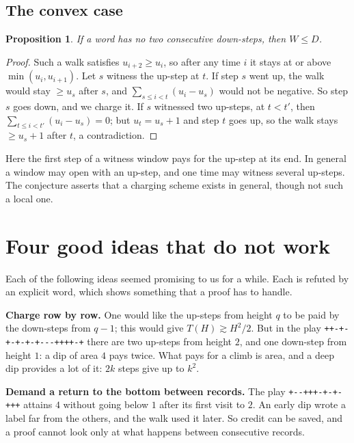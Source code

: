 \documentclass[11pt]{amsart}
\newtheorem{proposition}[theorem]{Proposition}
\theoremstyle{definition}
\begin{document}
\subsection{The convex case}
\begin{proposition}\label{prop:convex}
If a word has no two consecutive down-steps, then $W\le D$.
\end{proposition}

\begin{proof}
Such a walk satisfies $u_{i+2}\ge u_i$, so after any time $i$ it stays at or above $\min(u_i,u_{i+1})$. Let $s$ witness the
up-step at $t$. If step $s$ went up, the walk would stay $\ge u_s$ after $s$, and $\sum_{s\le i<t}(u_i-u_s)$ would not be
negative. So step $s$ goes down, and we charge it. If $s$ witnessed two up-steps, at $t<t'$, then $\sum_{t\le i<t'}(u_i-u_s)=0$;
but $u_t=u_s+1$ and step $t$ goes up, so the walk stays $\ge u_s+1$ after $t$, a contradiction.
\end{proof}

Here the first step of a witness window pays for the up-step at its end. In general a window may open with an
up-step, and one time may witness several up-steps. The conjecture asserts that a charging scheme exists in general, though not such a local one.

\section{Four good ideas that do not work}\label{sec:obstructions}

Each of the following ideas seemed promising to us for a while. Each is refuted by an explicit word, which shows
something that a proof has to handle.

\medskip\noindent\textbf{Charge row by row.} One would like the up-steps from height $q$ to be paid by the down-steps
from $q-1$; this would give $T(H)\gtrsim H^2/2$. But in the play \texttt{++-+-+-+-+-+{}-{}-{}-++++-+} there are two up-steps from height
$2$, and one down-step from height $1$: a dip of area $4$ pays twice. What pays for
a climb is area, and a deep dip provides a lot of it: $2k$ steps give up to $k^2$.

\medskip\noindent\textbf{Demand a return to the bottom between records.} The play \texttt{+{}-{}-+++-+-+-+++} attains $4$ without going
below $1$ after its first visit to $2$. An early dip wrote a label far from the others, and the
walk used it later. So credit can be saved, and a proof cannot look only at what happens between consecutive records.
\end{document}
